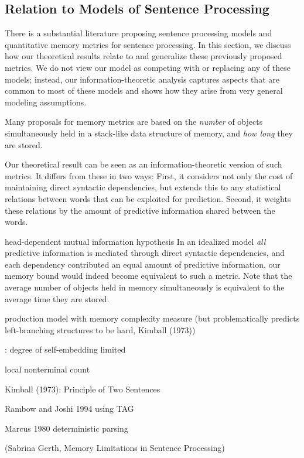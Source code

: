 \subsection{Relation to Models of Sentence Processing}

There is a substantial literature proposing sentence processing models and quantitative memory metrics for sentence processing.
In this section, we discuss how our theoretical results relate to and generalize these previously proposed metrics.
We do not view our model as competing with or replacing any of these models; instead, our information-theoretic analysis captures aspects that are common to most of these models and shows how they arise from very general modeling assumptions.

Many proposals for memory metrics are based on the \emph{number} of objects simultaneously held in a stack-like data structure of memory, and \emph{how long} they are stored.

Our theoretical result can be seen as an information-theoretic version of such metrics.
It differs from these in two ways:
First, it considers not only the cost of maintaining direct syntactic dependencies, but extends this to any statistical relations between words that can be exploited for prediction.
Second, it weights these relations by the amount of predictive information shared between the words.

head-dependent mutual information hypothesis
In an idealized model \emph{all} predictive information is mediated through direct syntactic dependencies, and each dependency contributed an equal amount of predictive information, our memory bound would indeed become equivalent to such a metric.
Note that the average number of objects held in memory simultaneously is equivalent to the average time they are stored.



\cite{yngve1960model} production model with memory complexity measure (but problematically predicts left-branching structures to be hard, Kimball (1973))

\cite{miller-finitary-1963}: degree of self-embedding limited

\cite{frazier1985syntactic} local nonterminal count

Kimball (1973): Principle of Two Sentences

Rambow and Joshi 1994 using TAG

Marcus 1980 deterministic parsing

(Sabrina Gerth, Memory Limitations in Sentence Processing)

